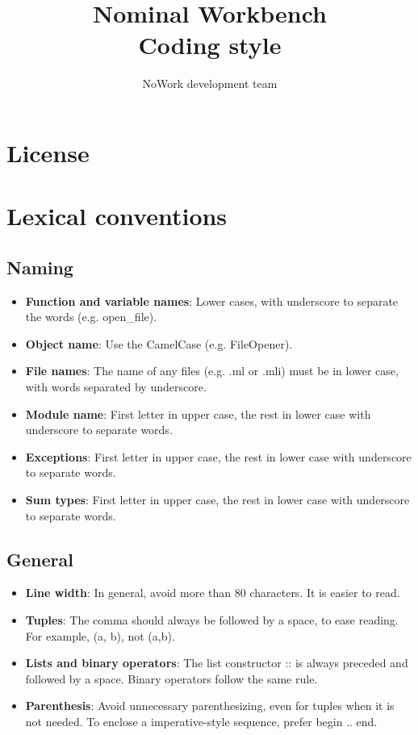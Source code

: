 \documentclass[12pt,a4paper]{article}
\title{Nominal Workbench \\
  Coding style}
\author{NoWork development team\\[2em]}
\begin{document}
\maketitle

\section{License}


\section{Lexical conventions}

\subsection{Naming}

\medskip

\begin{itemize}
\item \textbf{Function and variable names}: Lower cases, with underscore to 
  separate the words (e.g. open\_file).
\item \textbf{Object name}: Use the CamelCase (e.g. FileOpener).
\item \textbf{File names}: The name of any files (e.g. .ml or .mli) must be in
  lower case, with words separated by underscore.
\item \textbf{Module name}: First letter in upper case, the rest in lower case
  with underscore to separate words.
\item \textbf{Exceptions}: First letter in upper case, the rest in
  lower case with underscore to separate words.
\item \textbf{Sum types}: First letter in upper case, the rest in lower case
  with underscore to separate words.
\end{itemize}

\subsection{General}

\medskip 

\begin{itemize}
\item \textbf{Line width}: In general, avoid more than 80 characters. It is
  easier to read.
\item \textbf{Tuples}: The comma should always be followed by a space, to ease
  reading. For example, \textsf{(a, b)}, not \textsf{(a,b)}.
\item \textbf{Lists and binary operators}: The list constructor \textsf{::} is
  always preceded and followed by a space. Binary operators follow the same
  rule.
\item \textbf{Parenthesis}: Avoid unnecessary parenthesizing, even for tuples when
  it is not needed. To enclose a imperative-style sequence, prefer \textsf{begin
    .. end}.
\end{itemize}
\end{document}
